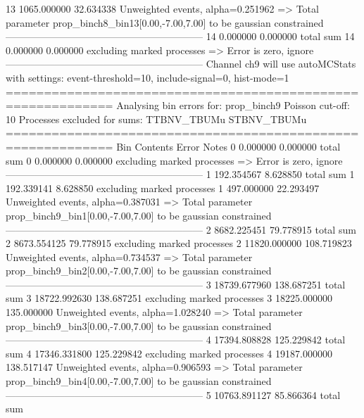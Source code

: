 13         1065.000000     32.634338       Unweighted events, alpha=0.251962
  => Total parameter prop_binch8_bin13[0.00,-7.00,7.00] to be gaussian constrained
------------------------------------------------------------
14         0.000000        0.000000        total sum                     
14         0.000000        0.000000        excluding marked processes    
  => Error is zero, ignore      
------------------------------------------------------------
Channel ch9 will use autoMCStats with settings: event-threshold=10, include-signal=0, hist-mode=1
============================================================
Analysing bin errors for: prop_binch9
Poisson cut-off: 10
Processes excluded for sums: TTBNV_TBUMu STBNV_TBUMu
============================================================
Bin        Contents        Error           Notes                         
0          0.000000        0.000000        total sum                     
0          0.000000        0.000000        excluding marked processes    
  => Error is zero, ignore      
------------------------------------------------------------
1          192.354567      8.628850        total sum                     
1          192.339141      8.628850        excluding marked processes    
1          497.000000      22.293497       Unweighted events, alpha=0.387031
  => Total parameter prop_binch9_bin1[0.00,-7.00,7.00] to be gaussian constrained
------------------------------------------------------------
2          8682.225451     79.778915       total sum                     
2          8673.554125     79.778915       excluding marked processes    
2          11820.000000    108.719823      Unweighted events, alpha=0.734537
  => Total parameter prop_binch9_bin2[0.00,-7.00,7.00] to be gaussian constrained
------------------------------------------------------------
3          18739.677960    138.687251      total sum                     
3          18722.992630    138.687251      excluding marked processes    
3          18225.000000    135.000000      Unweighted events, alpha=1.028240
  => Total parameter prop_binch9_bin3[0.00,-7.00,7.00] to be gaussian constrained
------------------------------------------------------------
4          17394.808828    125.229842      total sum                     
4          17346.331800    125.229842      excluding marked processes    
4          19187.000000    138.517147      Unweighted events, alpha=0.906593
  => Total parameter prop_binch9_bin4[0.00,-7.00,7.00] to be gaussian constrained
------------------------------------------------------------
5          10763.891127    85.866364       total sum                     
